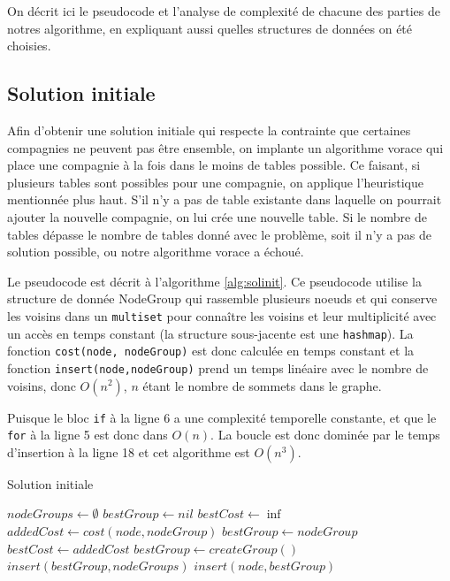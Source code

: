 \documentclass[letterpaper,12pt,final]{article}
\begin{document}
On décrit ici le pseudocode et l'analyse de complexité de chacune des
parties de notres algorithme, en expliquant aussi quelles structures
de données on été choisies.

\subsection{Solution initiale}

Afin d'obtenir une solution initiale qui respecte la contrainte que
certaines compagnies ne peuvent pas être ensemble, on implante un
algorithme vorace qui place une compagnie à la fois dans le moins de
tables possible. Ce faisant, si plusieurs tables sont possibles pour
une compagnie, on applique l'heuristique mentionnée plus haut. S'il
n'y a pas de table existante dans laquelle on pourrait ajouter la
nouvelle compagnie, on lui crée une nouvelle table.  Si le nombre de
tables dépasse le nombre de tables donné avec le problème, soit il n'y
a pas de solution possible, ou notre algorithme vorace a échoué.

Le pseudocode est décrit à l'algorithme \ref{alg:solinit}. Ce
pseudocode utilise la structure de donnée NodeGroup qui rassemble
plusieurs noeuds et qui conserve les voisins dans un
\lstinline|multiset| pour connaître les voisins et leur multiplicité
avec un accès en temps constant (la structure sous-jacente est une
\lstinline|hashmap|). La fonction \lstinline|cost(node, nodeGroup)|
est donc calculée en temps constant et la fonction
\lstinline|insert(node,nodeGroup)| prend un temps linéaire avec le
nombre de voisins, donc $O(n^2)$, $n$ étant le nombre de sommets dans
le graphe.

Puisque le bloc \lstinline|if| à la ligne 6 a une complexité
temporelle constante, et que le \lstinline|for| à la ligne 5 est donc
dans $O(n)$. La boucle est donc dominée par le temps d'insertion à la
ligne 18 et cet algorithme est $O(n^3)$.

\begin{algorithm}
  \caption{Solution initiale}
  \label{alg:solinit}
  \begin{algorithmic}[1]
    \State $nodeGroups \gets \emptyset$
    \State $bestGroup \gets nil$
    \State $bestCost \gets \inf$
    \State $addedCost \gets cost(node, nodeGroup)$
    \State $bestGroup \gets nodeGroup$
    \State $bestCost \gets addedCost$
    \EndIf
    \EndIf
    \EndFor
    \State $bestGroup \gets createGroup()$
    \State $insert(bestGroup, nodeGroups)$
    \EndIf
    \State $insert(node, bestGroup)$  
    \EndFor
  \end{algorithmic}
\end{algorithm}
\end{document}
